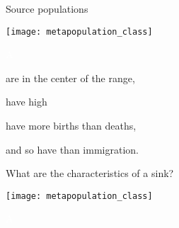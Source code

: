 \documentclass[t]{beamer}
\begin{document}
%

\begin{frame}[t]{Source populations}
	\begin{minipage}{0.5\textwidth}
		\begin{center}
			\vspace{1\baselineskip}
			\texttt{[image: metapopulation\_class]}
		\end{center}
	\end{minipage}\begin{minipage}{0.5\textwidth}
		\flushleft
		
		\hangpara \textcolor{white}{A}\vspace{-1\baselineskip}
		
		\hangpara are in the center of the range,\pause
		
		\hangpara have high \pause
		
		\hangpara have more births than deaths, \pause
		
		\hangpara and so have  than immigration.
		
	\end{minipage}	
\end{frame}

%

\begin{frame}[t]{What are the characteristics of a sink?}
	\begin{minipage}{0.5\textwidth}
		\begin{center}
			\vspace{1\baselineskip}
			\texttt{[image: metapopulation\_class]}
		\end{center}
	\end{minipage}\begin{minipage}{0.5\textwidth}
		\flushleft
		
		\hangpara \textcolor{white}{A}\vspace{-1\baselineskip}
		
		\hangpara \makebox[0.8\textwidth]{\hrulefill}
		
		\hangpara \makebox[0.8\textwidth]{\hrulefill}
		
		\hangpara \makebox[0.8\textwidth]{\hrulefill}
		
		\hangpara \makebox[0.8\textwidth]{\hrulefill}
		
	\end{minipage}	
\end{frame}
%
\end{document}
